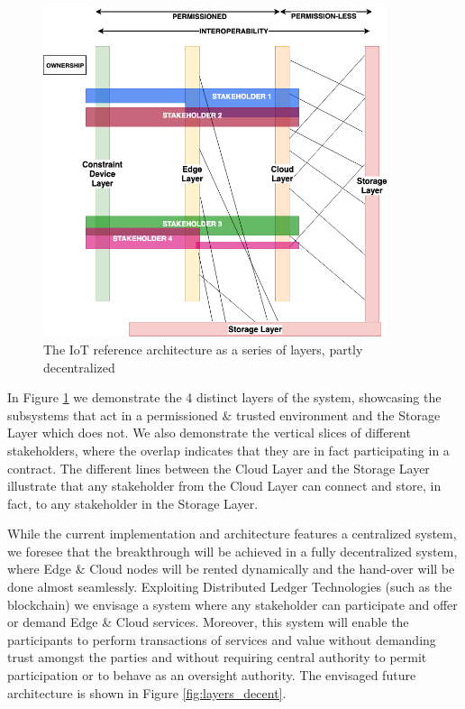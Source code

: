 \begin{figure}[h]
    \centering
    \includegraphics[width=0.9\textwidth]{images/layers_now_v2.png}
    \caption{The IoT reference architecture as a series of layers, partly decentralized }
    \label{fig:layers_now}
\end{figure}

In Figure \ref{fig:layers_now} we demonstrate the 4 distinct layers of the system, showcasing the subsystems that act in a permissioned \& trusted environment and the Storage Layer which does not. We also demonstrate the vertical slices of different stakeholders, where the overlap indicates that they are in fact participating in a contract. The different lines between the Cloud Layer and the Storage Layer illustrate that any stakeholder from the Cloud Layer can connect and store, in fact, to any stakeholder in the Storage Layer.
 
While the current implementation and architecture features a centralized system, we foresee that the breakthrough will be achieved in a fully decentralized system, where Edge \& Cloud nodes will be rented dynamically and the hand-over will be done almost seamlessly. Exploiting Distributed Ledger Technologies (such as the blockchain) we envisage a system where any stakeholder can participate and offer or demand Edge \& Cloud services. Moreover, this system will enable the participants to perform transactions of services and value without demanding trust amongst the parties and without requiring central authority to permit participation or to behave as an oversight authority. The envisaged future architecture is shown in Figure \ref{fig:layers_decent}.

